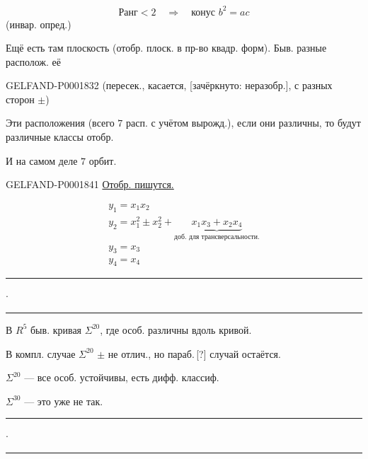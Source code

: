 \begin{equation*}\text{Ранг}<2\quad\Longrightarrow\quad\text{конус }b^2=ac\end{equation*}
(инвар. опред.)

Ещё есть там плоскость (отобр. плоск. в пр-во квадр. форм). Быв. разные располож. её

\begin{GelfandAdjacentEvidence}{GELFAND-P000183}{2}
(пересек., касается, [зачёркнуто: неразобр.], с разных сторон $\pm$)
\end{GelfandAdjacentEvidence}

Эти расположения (всего $7$ расп. с учётом вырожд.), если они различны, то будут различные классы отобр.

И на самом деле $7$ орбит.




\begin{GelfandAdjacentEvidence}{GELFAND-P000184}{1}
\underline{Отобр. пишутся.}

\begin{gather*}
y_1=x_1x_2\\
y_2=x_1^2\pm x_2^2+\underbrace{x_1x_3+x_2x_4}_{\text{доб. для трансверсальности.}}\\
y_3=x_3\\
y_4=x_4
\end{gather*}


\begin{center}\rule{12mm}{.4pt}\kern2mm$\cdot$\kern2mm\rule{12mm}{.4pt}\end{center}

В $R^5$ быв. кривая $\Sigma^{20}$, где особ. различны вдоль кривой.

В компл. случае $\Sigma^{20}$ $\pm$ не отлич., но параб.\,[?] случай остаётся.
\end{GelfandAdjacentEvidence}

$\Sigma^{20}$ — все особ. устойчивы, есть дифф. классиф.

$\Sigma^{30}$ — это уже не так.
\begin{center}\rule{12mm}{.4pt}\kern2mm$\cdot$\kern2mm\rule{12mm}{.4pt}\end{center}

